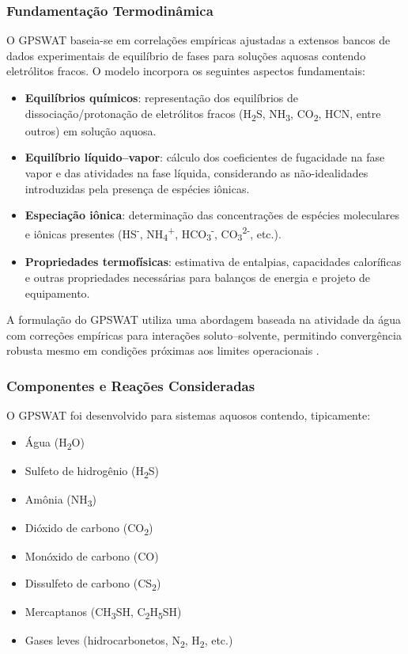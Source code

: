 \documentclass[10pt,a4paper]{article}
\begin{document}
\subsubsection{Fundamentação Termodinâmica}

O GPSWAT baseia-se em correlações empíricas ajustadas a extensos bancos de dados experimentais de equilíbrio de fases para soluções aquosas contendo eletrólitos fracos. O modelo incorpora os seguintes aspectos fundamentais:

\begin{itemize}[leftmargin=4em, itemsep=0pt]
  \item \textbf{Equilíbrios químicos}: representação dos equilíbrios de dissociação/protonação de eletrólitos fracos (H\textsubscript{2}S, NH\textsubscript{3}, CO\textsubscript{2}, HCN, entre outros) em solução aquosa.
  \item \textbf{Equilíbrio líquido–vapor}: cálculo dos coeficientes de fugacidade na fase vapor e das atividades na fase líquida, considerando as não-idealidades introduzidas pela presença de espécies iônicas.
  \item \textbf{Especiação iônica}: determinação das concentrações de espécies moleculares e iônicas presentes (HS\textsuperscript{-}, NH\textsubscript{4}\textsuperscript{+}, HCO\textsubscript{3}\textsuperscript{-}, CO\textsubscript{3}\textsuperscript{2-}, etc.).
  \item \textbf{Propriedades termofísicas}: estimativa de entalpias, capacidades caloríficas e outras propriedades necessárias para balanços de energia e projeto de equipamento.
\end{itemize}

A formulação do GPSWAT utiliza uma abordagem baseada na atividade da água com correções empíricas para interações soluto–solvente, permitindo convergência robusta mesmo em condições próximas aos limites operacionais \cite{fernandez2004}.

\subsubsection{Componentes e Reações Consideradas}

O GPSWAT foi desenvolvido para sistemas aquosos contendo, tipicamente:
\begin{itemize}[leftmargin=4em, itemsep=0pt]
  \item Água (H\textsubscript{2}O)
  \item Sulfeto de hidrogênio (H\textsubscript{2}S)
  \item Amônia (NH\textsubscript{3})
  \item Dióxido de carbono (CO\textsubscript{2})
  \item Monóxido de carbono (CO)
  \item Dissulfeto de carbono (CS\textsubscript{2})
  \item Mercaptanos (CH\textsubscript{3}SH, C\textsubscript{2}H\textsubscript{5}SH)
  \item Gases leves (hidrocarbonetos, N\textsubscript{2}, H\textsubscript{2}, etc.)
\end{itemize}
\end{document}
